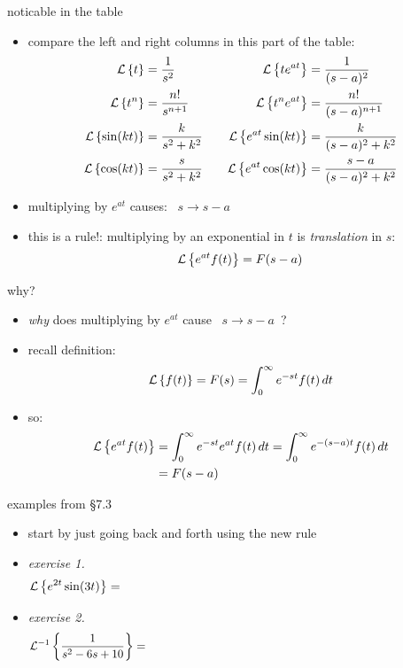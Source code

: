 \documentclass[urlcolor=blue,dvipsnames]{beamer}
\begin{document}
\begin{frame}{noticable in the table}

\begin{itemize}
\item compare the left and right columns in this part of the table:
\small
\begin{align*}
\mathcal{L}\left\{t\right\} &= \frac{1}{s^2}            &&& \mathcal{L}\left\{te^{at}\right\} &= \frac{1}{(s-a)^2} \\
\mathcal{L}\left\{t^n\right\} &= \frac{n!}{s^{n+1}}     &&& \mathcal{L}\left\{t^n e^{at}\right\} &= \frac{n!}{(s-a)^{n+1}} \\
\mathcal{L}\left\{\sin(kt)\right\} &= \frac{k}{s^2+k^2} &&& \mathcal{L}\left\{e^{at}\sin(kt)\right\} &= \frac{k}{(s-a)^2+k^2} \\
\mathcal{L}\left\{\cos(kt)\right\} &= \frac{s}{s^2+k^2} &&& \mathcal{L}\left\{e^{at}\cos(kt)\right\} &= \frac{s-a}{(s-a)^2+k^2}
\end{align*}
\item multiplying by $e^{at}$ causes: \, $s\to s-a$
\item this is a rule!: multiplying by an exponential in $t$ is \emph{translation} in $s$:
   $$\mathcal{L}\left\{e^{at} f(t)\right\} = F(s-a)$$
\end{itemize}
\end{frame}


\begin{frame}{why?}

\begin{itemize}
\item \emph{why} does multiplying by $e^{at}$ cause \, $s\to s-a$ \,?
\item recall definition:
   $$\mathcal{L}\left\{f(t)\right\} = F(s) = \int_0^\infty e^{-st} f(t)\,dt$$
\item so:
\begin{align*}
\mathcal{L}\left\{e^{at} f(t)\right\} &= \int_0^\infty e^{-st} e^{at} f(t)\,dt = \int_0^\infty e^{-(s-a)t} f(t)\,dt \\
   &= F(s-a)
\end{align*}
\end{itemize}
\end{frame}


\begin{frame}{examples from \S7.3}

\begin{itemize}
\item start by just going back and forth using the new rule
\item \emph{exercise 1.} %
   $$\LL{e^{2t} \sin(3t)} = \hspace{100mm}$$

\vspace{20mm}
\item \emph{exercise 2.} %
   $$\LLi{\frac{1}{s^2-6s+10}} = \hspace{100mm}$$

\vspace{20mm}
\end{itemize}
\end{frame}
\end{document}
